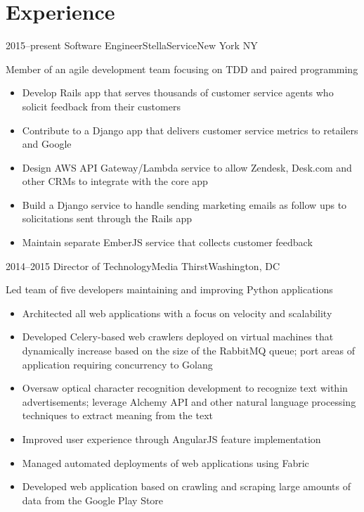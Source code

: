 \documentclass[10pt,a4paper,roman]{moderncv}        %
\begin{document}
\makecvtitle
\vspace{-1.25cm}

\section{Experience}

\cventry
{2015--present}
{Software Engineer}{StellaService}{New York NY}{}
{Member of an agile development team focusing on TDD and paired programming
\begin{itemize}
\item Develop Rails app that serves thousands of customer service agents who solicit feedback from their customers
\item Contribute to a Django app that delivers customer service metrics to retailers and Google
\item Design AWS API Gateway/Lambda service to allow Zendesk, Desk.com and other CRMs to integrate with the core app
\item Build a Django service to handle sending marketing emails as follow ups to solicitations sent through the Rails app
\item Maintain separate EmberJS service that collects customer feedback
\end{itemize}}

\cventry
{2014--2015}
{Director of Technology}{Media Thirst}{Washington, DC}{}
{Led team of five developers maintaining and improving Python applications
\begin{itemize}
\item Architected all web applications with a focus on velocity and scalability
\item Developed Celery-based web crawlers deployed on virtual machines that dynamically increase based on the size of the RabbitMQ queue; port areas of application requiring concurrency to Golang
\item Oversaw optical character recognition development to recognize text within advertisements; leverage Alchemy API and other natural language processing techniques to extract meaning from the text
\item Improved user experience through AngularJS feature implementation
\item Managed automated deployments of web applications using Fabric
\item Developed web application based on crawling and scraping large amounts of data from the Google Play Store
\end{itemize}}
\vspace{.15cm}
\end{document}

